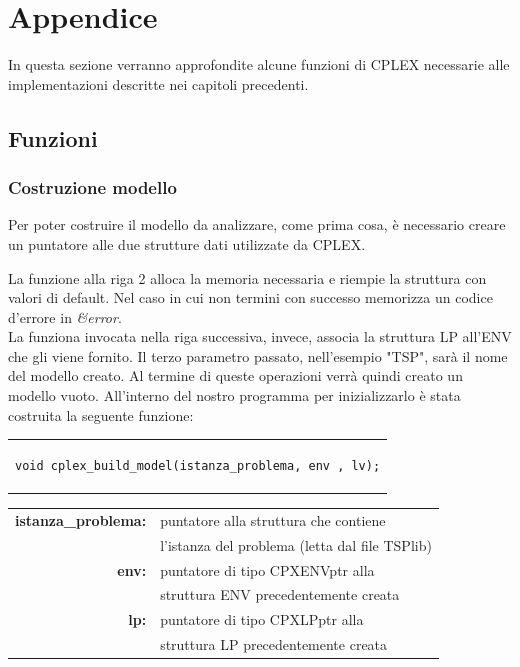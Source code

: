 \chapter{Appendice}
In questa sezione verranno approfondite alcune funzioni di CPLEX necessarie alle implementazioni descritte nei capitoli precedenti.
\section{Funzioni}
\subsection{Costruzione modello}
Per poter costruire il modello da analizzare, come prima cosa, è necessario creare un puntatore alle due strutture dati utilizzate da CPLEX.

La funzione alla riga 2 alloca la memoria necessaria e riempie la struttura con valori di default. Nel caso in cui non termini con successo memorizza un codice d'errore in \textit{\&error}.\\
La funziona invocata nella riga successiva, invece, associa la struttura LP all'ENV che gli viene fornito. Il terzo parametro passato, nell'esempio "TSP", sarà il nome del modello creato.
Al termine di queste operazioni verrà quindi creato un modello vuoto. All'interno del nostro programma per inizializzarlo è stata costruita la seguente funzione:
\begin{center}
\begin{tabular}{c}
\begin{lstlisting}[linewidth=320pt, basicstyle=\footnotesize\sffamily,] 
void cplex_build_model(istanza_problema, env , lv);
\end{lstlisting}
\end{tabular}
\end{center}
\begin{table}[h]
\centering
\begin{tabular}{rl}
\textbf{istanza\_problema: } & {puntatore alla struttura che contiene} \\
&  {l'istanza del problema (letta dal file TSPlib)} \\
\textbf{env: } & {puntatore di tipo CPXENVptr alla}\\
& {struttura ENV precedentemente creata}\\
\textbf{lp: } & {puntatore di tipo CPXLPptr alla}\\
& {struttura LP  precedentemente creata}\\
\end{tabular}
\end{table}
